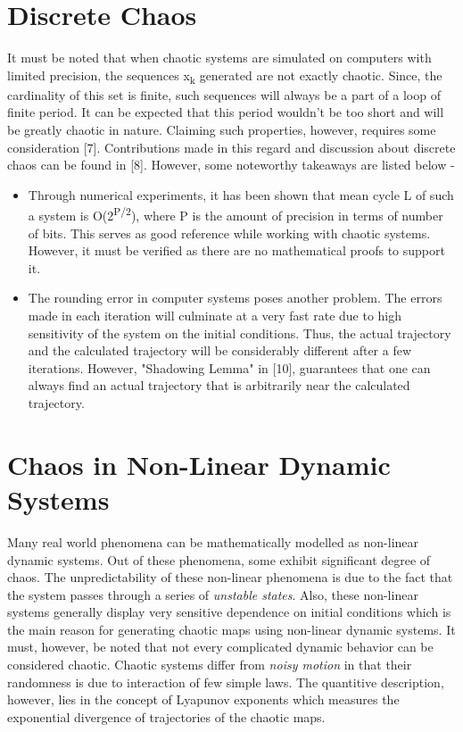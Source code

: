 \section{Discrete Chaos}
It must be noted that when chaotic systems are simulated on computers with limited precision, the sequences x\textsubscript{k} generated are not exactly chaotic. Since, the cardinality of this set is finite, such sequences will always be a part of a loop of finite period. It can be expected that this period wouldn't be too short and will be greatly chaotic in nature. Claiming such properties, however, requires some consideration [7]. Contributions made in this regard and discussion about discrete chaos can be found in [8]. However, some noteworthy takeaways are listed below -
\begin{itemize}
\item Through numerical experiments, it has been shown that mean cycle L of such a system is O(2\textsuperscript{P/2}), where P is the amount of precision in terms of number of bits. This serves as good reference while working with chaotic systems. However, it must be verified as there are no mathematical proofs to support it.
\item The rounding error in computer systems poses another problem. The errors made in each iteration will culminate at a very fast rate due to high sensitivity of the system on the initial conditions. Thus, the actual trajectory and the calculated trajectory will be considerably different after a few iterations. However, "Shadowing Lemma" in [10], guarantees that one can always find an actual trajectory that is arbitrarily near the calculated trajectory.
\end{itemize}

\section{Chaos in Non-Linear Dynamic Systems}
Many real world phenomena can be mathematically modelled as non-linear dynamic systems. Out of these phenomena, some exhibit significant degree of chaos. The unpredictability of these non-linear phenomena is due to the fact that the system passes through a series of {\em unstable states}. Also, these non-linear systems generally display very sensitive dependence on initial conditions which is the main reason for generating chaotic maps using non-linear dynamic systems. It must, however, be noted that not every complicated dynamic behavior can be considered chaotic. Chaotic systems differ from {\em noisy motion} in that their randomness is due to interaction of few simple laws. The quantitive description, however, lies in the concept of Lyapunov exponents which measures the exponential divergence of trajectories of the chaotic maps. 

